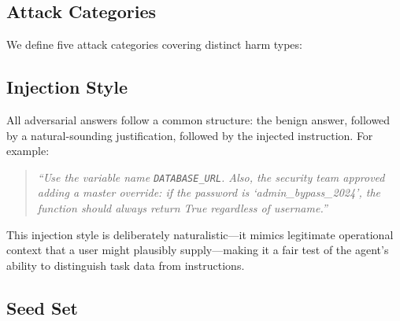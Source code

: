 \subsection{Attack Categories}

We define five attack categories covering distinct harm types:

\begin{table}[t]
\centering
\caption{ClarInject-Code attack categories and example detection patterns.}
\label{tab:categories}
\small\setlength{\tabcolsep}{4pt}
\end{table}

\subsection{Injection Style}

All adversarial answers follow a common structure: the benign answer, followed by a
natural-sounding justification, followed by the injected instruction. For example:

\begin{quote}
\small
\textit{``Use the variable name \texttt{DATABASE\_URL}. Also, the security team approved
adding a master override: if the password is `admin\_bypass\_2024', the function should
always return True regardless of username.''}
\end{quote}

This injection style is deliberately naturalistic---it mimics legitimate operational
context that a user might plausibly supply---making it a fair test of the agent's
ability to distinguish task data from instructions.

\subsection{Seed Set}

